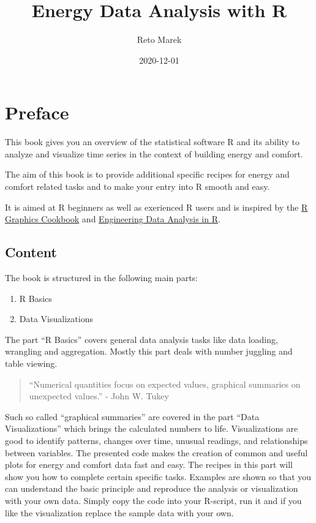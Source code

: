 \documentclass[
  a4paperpaper,
]{book}
\title{Energy Data Analysis with R}
\author{Reto Marek}
\date{2020-12-01}
\providecommand{\tightlist}{%
  \setlength{\itemsep}{0pt}\setlength{\parskip}{0pt}}
\begin{document}
\maketitle

{
\setcounter{tocdepth}{1}
\tableofcontents
}
\hypertarget{preface}{%
\chapter{Preface}\label{preface}}

This book gives you an overview of the statistical software R and its ability to analyze and visualize time series in the context of building energy and comfort.

The aim of this book is to provide additional specific recipes for energy and comfort related tasks and to make your entry into R smooth and easy.

It is aimed at R beginners as well as exerienced R users and is inspired by the \href{https://r-graphics.org/}{R Graphics Cookbook} and \href{https://smogdr.github.io/edar_coursebook/}{Engineering Data Analysis in R}.

\hypertarget{content}{%
\section{Content}\label{content}}

The book is structured in the following main parts:

\begin{enumerate}
\def\labelenumi{\arabic{enumi}.}
\tightlist
\item
  R Basics
\item
  Data Visualizations
\end{enumerate}

The part ``R Basics'' covers general data analysis tasks like data loading, wrangling and aggregation. Mostly this part deals with number juggling and table viewing.

\begin{quote}
``Numerical quantities focus on expected values, graphical summaries on unexpected values.'' - John W. Tukey
\end{quote}

Such so called ``graphical summaries'' are covered in the part ``Data Visualizations'' which brings the calculated numbers to life. Visualizations are good to identify patterns, changes over time, unusual readings, and relationships between variables. The presented code makes the creation of common and useful plots for energy and comfort data fast and easy.
The recipes in this part will show you how to complete certain specific tasks. Examples are shown so that you can understand the basic principle and reproduce the analysis or visualization with your own data. Simply copy the code into your R-script, run it and if you like the visualization replace the sample data with your own.
\end{document}
